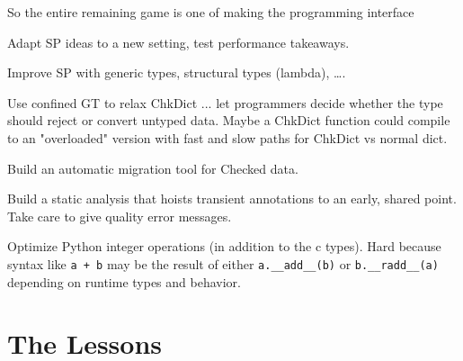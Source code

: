 \documentclass[english,cleveref,submission]{programming}
\newcommand{\code}[1]{\texttt{#1}}
\begin{document}

       So the entire remaining game is one of making the programming interface

Adapt SP ideas to a new setting, test performance takeaways.

Improve SP with generic types, structural types (lambda), \ldots.

Use confined GT to relax ChkDict ... let programmers decide whether
the type should reject or convert untyped data.
Maybe a ChkDict function could compile to an "overloaded" version with
fast and slow paths for ChkDict vs normal dict.

Build an automatic migration tool for Checked data.

Build a static analysis that hoists transient annotations to an early, shared point.
Take care to give quality error messages.

Optimize Python integer operations (in addition to the c types).
Hard because syntax like \code{a + b} may be the result of either \code{a.\_\_add\_\_(b)}
or \code{b.\_\_radd\_\_(a)} depending on runtime types and behavior.


\section{The Lessons}
\label{s:conclusion}
\end{document}
